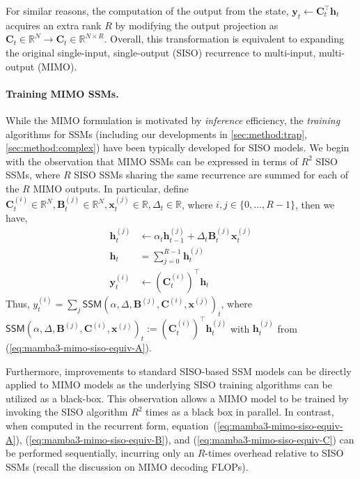 \documentclass{article}
\def\eqref#1{equation~(\ref{#1})}
\def\plaineqref#1{(\ref{#1})}
\def\vh{{\bm{h}}}
\def\vx{{\bm{x}}}
\def\vy{{\bm{y}}}
\def\bB{{\bm{B}}}
\def\bC{{\bm{C}}}
\theoremstyle{plain}
\theoremstyle{definition}
\theoremstyle{remark}
\begin{document}
For similar reasons, the computation of the output from the state, $\vy_t \gets \bC_t^\top \vh_t$ acquires an extra rank $R$ by modifying the output projection as $\bC_t \in \mathbb{R}^{N} \to \bC_t \in \mathbb{R}^{N \times R}$.
Overall, this transformation is equivalent to expanding the original single-input, single-output (SISO) recurrence to multi-input, multi-output (MIMO).

\paragraph{Training MIMO SSMs.}

While the MIMO formulation is motivated by \emph{inference} efficiency, the \emph{training} algorithms for SSMs (including our developments in \cref{sec:method:trap}, \cref{sec:method:complex}) have been typically developed for SISO models.
We begin with the observation that 
MIMO SSMs can be expressed in terms of $R^2$ SISO SSMs, where $R$ SISO SSMs sharing the same recurrence are summed for each of the $R$ MIMO outputs.
In particular,
define $ \bC_t^{(i)} \in \mathbb{R}^N, \bB_t^{(j)} \in \mathbb{R}^N, \vx_t^{(j)} \in \mathbb{R}, \Delta_t \in \mathbb{R}$, where $i,j \in \{0, ..., R-1\}$, then we have,
\begin{align}
    \vh_t^{(j)} &\gets \alpha_t\vh_{t-1}^{(j)} + \Delta_t\bB_t^{(j)} \vx_t^{(j)} \label{eq:mamba3-mimo-siso-equiv-A}\\ 
    \vh_t &= \sum_{j=0}^{R-1} \vh_t^{(j)} \label{eq:mamba3-mimo-siso-equiv-B}\\
    \vy_t^{(i)} &\gets \left(\bC_t^{(i)}\right)^\top \vh_t \label{eq:mamba3-mimo-siso-equiv-C}
\end{align}
Thus, $y_t^{(i)} = \sum_j \mathsf{SSM}\!\left(\alpha,\Delta,\bB^{(j)},\bC^{(i)},\vx^{(j)}\right)_t$, where $\mathsf{SSM}\!\left(\alpha,\Delta,\bB^{(j)},\bC^{(i)},\vx^{(j)}\right)_t := \left(\bC_t^{(i)}\right)^\top \vh_t^{(j)}$ with $\vh_t^{(j)}$ from \plaineqref{eq:mamba3-mimo-siso-equiv-A}.

Furthermore, improvements to standard SISO-based SSM models can be directly applied to MIMO models as the underlying SISO training algorithms can be utilized as a black-box.
This observation allows a MIMO model to be trained by invoking the SISO algorithm $R^2$ times as a black box in parallel.
In contrast, when computed in the recurrent form, \eqref{eq:mamba3-mimo-siso-equiv-A}, \plaineqref{eq:mamba3-mimo-siso-equiv-B}, and \plaineqref{eq:mamba3-mimo-siso-equiv-C} can be performed sequentially, incurring only an $R$-times overhead relative to SISO SSMs (recall the discussion on MIMO decoding FLOPs).
\end{document}
